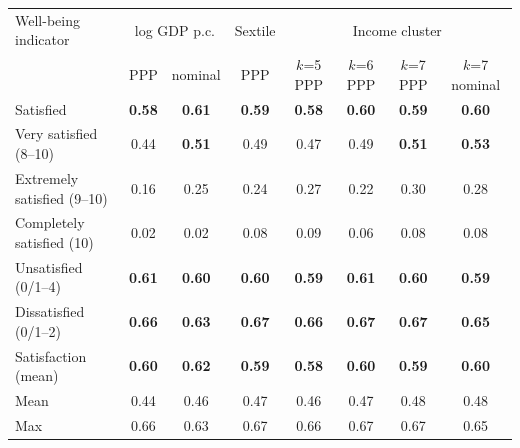 \begin{tabular}{lccccccc}
\toprule
Well-being indicator & \multicolumn{2}{c}{log GDP p.c.} & Sextile & \multicolumn{4}{c}{Income cluster} \\ & PPP & nominal & PPP & $k$=5 PPP & $k$=6 PPP & $k$=7 PPP & $k$=7 nominal \\
\midrule
Satisfied & \textbf{0.58} & \textbf{0.61} & \textbf{0.59} & \textbf{0.58} & \textbf{0.60} & \textbf{0.59} & \textbf{0.60} \\
Very satisfied (8--10) & 0.44 & \textbf{0.51} & 0.49 & 0.47 & 0.49 & \textbf{0.51} & \textbf{0.53} \\
Extremely satisfied (9--10) & 0.16 & 0.25 & 0.24 & 0.27 & 0.22 & 0.30 & 0.28 \\
Completely satisfied (10) & 0.02 & 0.02 & 0.08 & 0.09 & 0.06 & 0.08 & 0.08 \\
Unsatisfied (0/1--4) & \textbf{0.61} & \textbf{0.60} & \textbf{0.60} & \textbf{0.59} & \textbf{0.61} & \textbf{0.60} & \textbf{0.59} \\
Dissatisfied (0/1--2) & \textbf{0.66} & \textbf{0.63} & \textbf{0.67} & \textbf{0.66} & \textbf{0.67} & \textbf{0.67} & \textbf{0.65} \\
Satisfaction (mean) & \textbf{0.60} & \textbf{0.62} & \textbf{0.59} & \textbf{0.58} & \textbf{0.60} & \textbf{0.59} & \textbf{0.60} \\
\midrule
Mean & 0.44 & 0.46 & 0.47 & 0.46 & 0.47 & 0.48 & 0.48 \\
Max & 0.66 & 0.63 & 0.67 & 0.66 & 0.67 & 0.67 & 0.65 \\
\bottomrule
\end{tabular}
